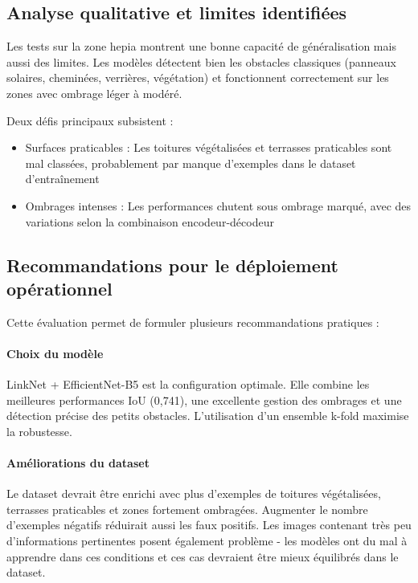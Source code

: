 \subsection{Analyse qualitative et limites identifiées}

Les tests sur la zone \acrshort{hepia} montrent une bonne capacité de généralisation mais aussi des limites. Les modèles détectent bien les obstacles classiques (panneaux solaires, cheminées, verrières, végétation) et fonctionnent correctement sur les zones avec ombrage léger à modéré.

Deux défis principaux subsistent :

\begin{itemize}
    \item Surfaces praticables : Les toitures végétalisées et terrasses praticables sont mal classées, probablement par manque d'exemples dans le dataset d'entraînement
    \item Ombrages intenses : Les performances chutent sous ombrage marqué, avec des variations selon la combinaison encodeur-décodeur
\end{itemize}

\subsection{Recommandations pour le déploiement opérationnel}

Cette évaluation permet de formuler plusieurs recommandations pratiques :

\paragraph{Choix du modèle}
LinkNet + EfficientNet-B5 est la configuration optimale. Elle combine les meilleures performances IoU (0,741), une excellente gestion des ombrages et une détection précise des petits obstacles. L'utilisation d'un ensemble k-fold maximise la robustesse.

\paragraph{Améliorations du dataset}
Le dataset devrait être enrichi avec plus d'exemples de toitures végétalisées, terrasses praticables et zones fortement ombragées. Augmenter le nombre d'exemples négatifs réduirait aussi les faux positifs. Les images contenant très peu d'informations pertinentes posent également problème - les modèles ont du mal à apprendre dans ces conditions et ces cas devraient être mieux équilibrés dans le dataset.

